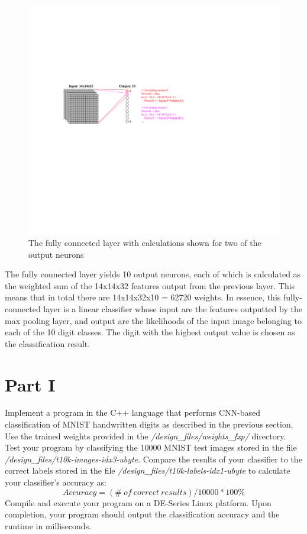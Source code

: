 \documentclass[epsfig,10pt,fullpage]{article}
\begin{document}
\begin{figure}[H]
   \begin{center}
       \hspace*{0.1cm}\includegraphics[scale=1.0]{figures/fig_fc_layer}
   \end{center}
   \caption{The fully connected layer with calculations shown for two of the output neurons}
	\label{fig:fc_layer}
\end{figure}

The fully connected layer yields 10 output neurons, each of which is calculated as the weighted sum of the 14x14x32 features output from the
previous layer. This means that in total there are 14x14x32x10 = 62720 weights.  
In essence, this fully-connected layer is a linear classifier whose input are the features outputted by the max pooling layer,
and output are the likelihoods of the input image belonging to each of the 10 digit classes.
The digit with the highest output value is chosen as the classification result.

\section*{Part I}
\noindent
Implement a program in the C++ language that performs CNN-based classification of MNIST handwritten digits as described in the previous section.
Use the trained weights provided in the \textit{/design\_files/weights\_fxp/} directory. 
Test your program by classifying the 10000 MNIST test images stored in the file \textit{/design\_files/t10k-images-idx3-ubyte}. 
Compare the results of your classifier to the correct labels stored in the file \textit{/design\_files/t10k-labels-idx1-ubyte} to calculate
your classifier's accuracy as: \[Accuracy = (\#\ of\ correct\ results )/ 10000 * 100\% \]
Compile and execute your program on a DE-Series Linux platform.
Upon completion, your program should output the classification accuracy and the runtime in milliseconds.
\end{document}
